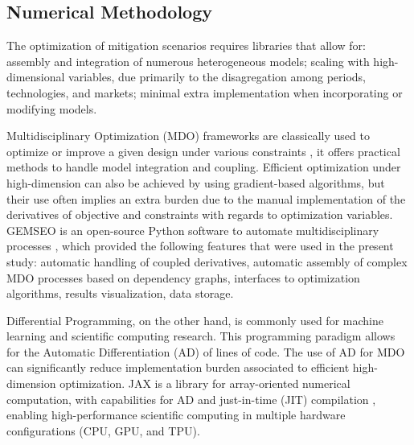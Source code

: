 \documentclass[a4paper,fleqn]{cas-dc}
\begin{document}
\subsection{Numerical Methodology}



The optimization of mitigation scenarios requires libraries that allow for: assembly and integration of numerous heterogeneous models; scaling with high-dimensional variables, due primarily to the disagregation among periods, technologies, and markets; minimal extra implementation when incorporating or modifying models.

Multidisciplinary Optimization (MDO) frameworks are classically used to optimize or improve a given design under various constraints \cite{mdobook}, it offers practical methods to handle model integration and coupling. Efficient optimization under high-dimension can also be achieved by using gradient-based algorithms, but their use often implies an extra burden due to the manual implementation of the derivatives of objective and constraints with regards to optimization variables. GEMSEO is an open-source Python software to automate multidisciplinary processes \cite{gallard_gems_2018}, which provided the following features that were used in the present study: automatic handling of coupled derivatives, automatic assembly of complex MDO processes based on dependency graphs, interfaces to optimization algorithms, results visualization, data storage.

Differential Programming, on the other hand, is commonly used for machine learning and scientific computing research. This programming paradigm allows for the Automatic Differentiation (AD) of lines of code. The use of AD for MDO can significantly reduce implementation burden associated to efficient high-dimension optimization. JAX is a library for array-oriented numerical computation, with capabilities for AD and just-in-time (JIT) compilation \cite{jax2018github}, enabling high-performance scientific computing in multiple hardware configurations (CPU, GPU, and TPU).
\end{document}
